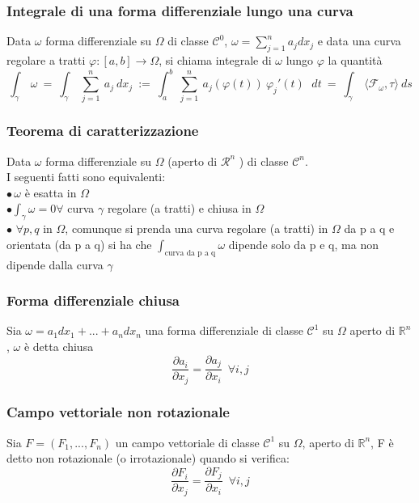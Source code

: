 \documentclass{article} %
\begin{document}
    \subsubsection*{Integrale di una forma differenziale lungo una curva}
    Data $\omega $ forma differenziale su $\Omega $ di classe $ \mathcal{C} ^0 $, $ \omega = \sum_{j = 1}^{n} a_j dx_j $
    e data una curva regolare a tratti $\varphi:[a,b]\to \Omega $, si chiama integrale di $\omega$ lungo $\varphi$ la quantità
    $$ \int _\gamma  \ \omega \ = \ \int _\gamma \ \sum_{j = 1}^{n} \ a_j \ dx_j\ :=\  \int_{a}^{b} \ \sum_{j = 1}^{n} \ a_j ( \varphi (t) ) \ \varphi_j ' (t) \,\ \ dt \ = \ \int _\gamma \ \langle \mathcal{F} _\omega , \tau \rangle \  ds  $$

    \subsubsection*{Teorema di caratterizzazione}
    Data $\omega$ forma differenziale su $\Omega$ (aperto di $\mathcal{R}^n$ ) di classe $\mathcal{C} ^n$. \\
    I seguenti fatti sono equivalenti: \\
    $\bullet \, \omega$ è esatta in $\Omega$ \\
    $\bullet \int_{\gamma} \omega = 0 \forall$ curva $\gamma$ regolare (a tratti) e chiusa in $\Omega$ \\
    $\bullet$ $\forall p,q$ in $\Omega$, comunque si prenda una curva regolare (a tratti) in $\Omega$ da p a q e orientata (da p a q) si ha che $ \int_{\text{curva da p a q}} \omega$ dipende solo da p e q, ma non dipende dalla curva $\gamma$


    \subsubsection*{Forma differenziale chiusa}
    Sia $\omega = a_1 dx_1 + ... + a_n dx_n$ una forma differenziale di classe $\mathcal{C} ^1$ su $\Omega$ aperto di $\mathbb{R}^n$, $\omega$ è detta chiusa \\
    $$ \frac{\partial a_i}{ \partial x_j} = \frac{\partial a_j}{\partial x_i} \,\,\, \forall i,j $$

    \subsubsection*{Campo vettoriale non rotazionale}
    Sia $F = (F_1,...,F_n)$ un campo vettoriale di classe $\mathcal{C} ^1$ su $\Omega$, aperto di $\mathbb{R}^n$, F è detto non rotazionale (o irrotazionale) quando si verifica:
    $$\frac{\partial F_i}{ \partial x_j} = \frac{\partial F_j}{\partial x_i} \,\,\, \forall i,j$$
\end{document}

